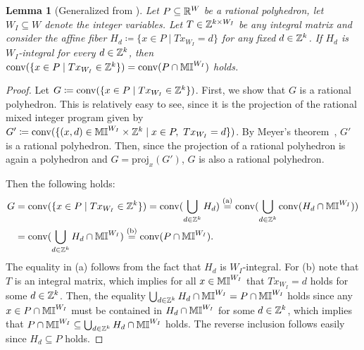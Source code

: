 \documentclass[pdflatex,sn-mathphys-num]{sn-jnl}%
\theoremstyle{thmstyleone}%
\newtheorem{lemma}[lemma]{Lemma}
\theoremstyle{thmstylethree}%
\theoremstyle{thmstyletwo}%
\newcommand{\conv}{\mathrm{conv}}
\newcommand{\proj}{\mathrm{proj}}
\begin{document}
\begin{lemma}[Generalized from \cite{BaderHWZ18}]
\label{thm_affine_fiber_integral}
Let $P \subseteq \mathbb{R}^W$ be a rational polyhedron, let $W_I\subseteq W$ denote the integer variables. Let $T\in \mathbb{Z}^{k\times W_I}$ be any integral matrix and consider the affine fiber $H_d \coloneqq \{x \in P \mid T x_{W_I} = d\}$ for any fixed $d\in \mathbb{Z}^k$. If $H_d$ is $W_I$-integral for every $d\in \mathbb{Z}^k$, then $\conv(\{x \in P \mid T x_{W_I} \in \Z^k\}) = \conv(P \cap \M^{W_I})$ holds.
\end{lemma}
\begin{proof}
    Let $G \coloneqq \conv(\{ x\in P \mid Tx_{W_I} \in \Z^{k}\})$. First, we show that $G$ is a rational polyhedron. This is relatively easy to see, since it is the projection of the rational mixed integer program given by $G'\coloneqq \conv(\{(x,d) \in \M^{W_I} \times \Z^k \mid x \in P,~ Tx_{W_I} = d\})$. By Meyer's theorem~\cite{Meyer74}, $G'$ is a rational polyhedron. Then, since the projection of a rational polyhedron is again a polyhedron and $G = \proj_{x}(G')$, $G$ is also a rational polyhedron.

    Then the following holds:
    \begin{align*}
        G &=\conv(\{ x\in P \mid Tx_{W_I} \in \Z^k\})= \conv(\bigcup_{d\in \Z^k} H_d) \stackrel{\textup{(a)}} =  \conv(\bigcup_{d\in \Z^k} \conv(H_d\cap \M^{W_I}))\\
        &= \conv(\bigcup_{d\in \Z^k} H_d \cap \M^{W_I})
        \stackrel{\textup{(b)}}= \conv( P \cap \M^{W_I}).
    \end{align*} The equality in \textup{(a)} follows from the fact that $H_d$ is $W_I$-integral. For \textup{(b)} note that $T$ is an integral matrix, which implies for all $x\in \mathbb{MI}^{W_I}$ that $T x_{W_I} = d$ holds for some $d\in \mathbb{Z}^k$. Then, the equality $\bigcup_{d\in \mathbb{Z}^k}H_d \cap \mathbb{MI}^{W_I} = P \cap \mathbb{MI}^{W_I}$ holds since any $x\in P\cap \mathbb{MI}^{W_I}$ must be contained in $H_d\cap \mathbb{MI}^{W_I}$ for some $d\in \mathbb{Z}^k$, which implies that $P\cap \mathbb{MI}^{W_I} \subseteq \bigcup_{d \in \mathbb{Z}^k} H_d\cap \mathbb{MI}^{W_I}$ holds. The reverse inclusion follows easily since $H_d \subseteq P$ holds.
\end{proof}
\end{document}
